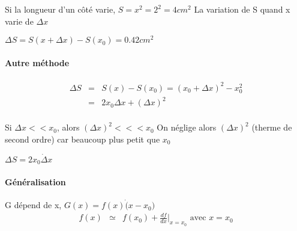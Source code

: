 Si la longueur d'un côté varie, $S = x^2 = 2^2 = 4cm^2$
La variation de S quand x varie de $\Delta x$

$\Delta S = S(x+\Delta x) - S(x_0) = 0.42 cm^2$

\paragraph{Autre méthode}
\[\begin{array}{rcl}
	\Delta S & = & S(x) - S(x_0) = (x_0 + \Delta x)^2 - x_0^2 \\
						 & = & 2x_0 \Delta x + (\Delta x)^2 \\
\end{array}\]

Si $\Delta x << x_0$, alors $(\Delta x)^2 <<< x_0$ On néglige alors $(\Delta x)^2$ (therme de second ordre) car beaucoup plus petit que $x_0$

$\Delta S = 2x_0 \dot \Delta x$
\paragraph{Généralisation} G dépend de x, $G(x) = f(x) \dot (x-x_0)$
\[\begin{array}{rcl}
	f(x) & \simeq & f(x_0) + \frac{df}{dx}|_{x=x_0} \text{ avec } x = x_0
\end{array}\]
